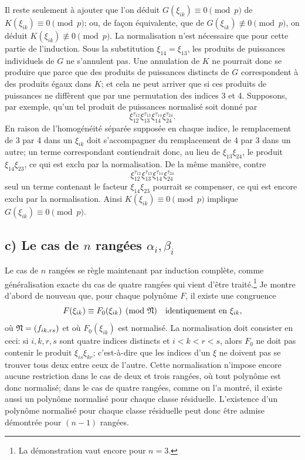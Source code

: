 Il reste seulement à ajouter que l'on déduit $G(\xi_{ik})\equiv0\pmod p$ de $K(\xi_{ik})\equiv0\pmod p$; ou, de façon équivalente, que de $G(\xi_{ik})\not\equiv0\pmod p$, on déduit $K(\xi_{ik})\not\equiv0\pmod p$. La normalisation n'est nécessaire que pour cette partie de l'induction. Sous la substitution $\xi_{14}=\xi_{13}$, les produits de puissances individuels de $G$ ne s'annulent pas. Une annulation de $K$ ne pourrait donc se produire que parce que des produits de puissances distincts de $G$ correspondent à des produits égaux dans $K$; et cela ne peut arriver que si ces produits de puissances ne diffèrent que par une permutation des indices 3 et 4. Supposons, par exemple, qu'un tel produit de puissances normalisé soit donné par
\[
        \xi_{12}^{\tau_{12}}\xi_{13}^{\tau_{13}}\xi_{14}^{\tau_{14}}\xi_{24}^{\tau_{24}}.
\]
En raison de l'homogénéité séparée supposée en chaque indice, le remplacement de 3 par 4 dans un $\xi_{ik}$ doit s'accompagner du remplacement de 4 par 3 dans un autre; un terme correspondant contiendrait donc, au lieu de $\xi_{13}\xi_{24}$, le produit $\xi_{14}\xi_{23}$, ce qui est exclu par la normalisation. De la même manière, contre
\[
        \xi_{12}^{\tau_{12}}\xi_{13}^{\tau_{13}}\xi_{14}^{\tau_{14}}\xi_{24}^{\tau_{24}}
\]
seul un terme contenant le facteur $\xi_{14}\xi_{23}$ pourrait se compenser, ce qui est encore exclu par la normalisation. Ainsi $K(\xi_{ik})\equiv0\pmod p$ implique $G(\xi_{ik})\equiv0\pmod p$.

\subsection*{c) Le cas de $n$ rangées $\alpha_i,\beta_i$}

Le cas de $n$ rangées se règle maintenant par induction complète, comme généralisation exacte du cas de quatre rangées qui vient d'être traité.\footnote{La démonstration vaut encore pour $n=3$.} Je montre d'abord de nouveau que, pour chaque polynôme $F$, il existe une congruence
\begin{equation}
        F(\xi_{ik})\equiv F_0(\xi_{ik})\pmod{\mathfrak N}
        \quad \text{identiquement en $\xi_{ik}$},
\end{equation}
où $\mathfrak N=(f_{ik,rs})$ et où $F_0(\xi_{ik})$ est normalisé. La normalisation doit consister en ceci: si $i,k,r,s$ sont quatre indices distincts et $i<k<r<s$, alors $F_0$ ne doit pas contenir le produit $\xi_{is}\xi_{kr}$; c'est-à-dire que les indices d'un $\xi$ ne doivent pas se trouver tous deux entre ceux de l'autre. Cette normalisation n'impose encore aucune restriction dans le cas de deux et trois rangées, où tout polynôme est donc normalisé; dans le cas de quatre rangées, comme on l'a montré, il existe aussi un polynôme normalisé pour chaque classe résiduelle. L'existence d'un polynôme normalisé pour chaque classe résiduelle peut donc être admise démontrée pour $(n-1)$ rangées.

